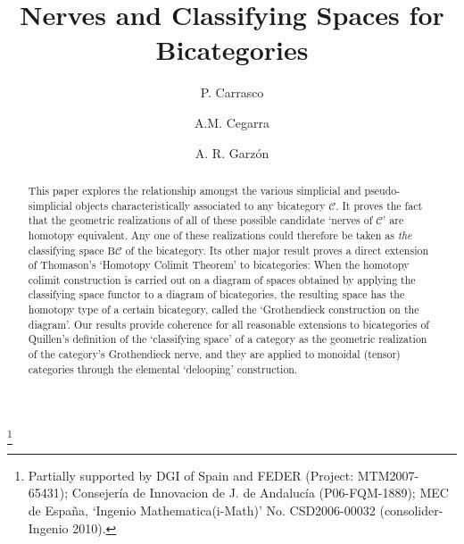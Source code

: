 \documentclass[]{amsart}
\begin{document}
\title[{\em Classifying Spaces for Bicategories}]
{{Nerves and Classifying Spaces for Bicategories}}

\author{P. Carrasco}
\author{A.M. Cegarra}
\author{A. R. Garz\'{o}n}
\thanks{ Partially supported by DGI of Spain and FEDER (Project: MTM2007-65431); Consejer\'{i}a de Innovacion
de J. de Andaluc\'{i}a (P06-FQM-1889); MEC de Espa\~{n}a, `Ingenio Mathematica(i-Math)' No.
CSD2006-00032 (consolider-Ingenio 2010).}
\address{
Departamento de \'Algebra \newline Facultad de Ciencias \newline Universidad de Granada
 Granada, Spain \newline mcarrasc@ugr.es\newline
acegarra@ugr.es\newline agarzon@ugr.es}

\begin{abstract}
This paper explores the relationship amongst the various simplicial and pseudo-simplicial objects
characteristically associated to any bicategory ${\ensuremath{\mathcal{C}}}$. It proves the fact that the geometric
realizations of all of these possible candidate `nerves of ${\ensuremath{\mathcal{C}}}$' are homotopy equivalent. Any one
of these realizations could therefore be taken as {\em the} classifying space ${\ensuremath{\mathrm{B}}}{\ensuremath{\mathcal{C}}}$ of the
bicategory. Its other major result  proves a direct extension of Thomason's `Homotopy Colimit
Theorem'  to bicategories: When the homotopy colimit construction is carried out on a diagram of
spaces obtained by applying the classifying space functor to a diagram of bicategories, the
resulting space has the homotopy type of a certain bicategory, called the `Grothendieck
construction on the diagram'. Our results provide coherence for all reasonable extensions to
bicategories of Quillen's definition of the `classifying space' of a category as  the geometric
realization of the category's Grothendieck nerve, and they are applied to monoidal (tensor)
categories through the elemental `delooping' construction.

\end{abstract}


\maketitle
\end{document}

